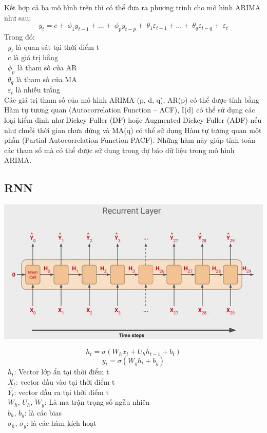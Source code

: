 Kết hợp cả ba mô hình trên thì có thể đưa ra phương trình cho mô hình ARIMA như sau:
\[y_{t} = c + \ \phi_{1}y_{t - 1} + \ldots + \ \phi_{p}y_{t - p} + \ \theta_{1}\varepsilon_{t - 1} + \ldots + \ \theta_{q}\varepsilon_{t - q} + \ \varepsilon_{t}\]
Trong đó:\\
    \indent\textbullet\ \(y_{t}\) là quan sát tại thời điểm t\\
    \indent\textbullet\ \(c\) là giá trị hằng\\
    \indent\textbullet\ \(\phi_{p}\) là tham số của AR\\
    \indent\textbullet\ \(\theta_{q}\) là tham số của MA\\
    \indent\textbullet\ \(\varepsilon_{t}\) là nhiễu trắng\\

Các giá trị tham số của mô hình ARIMA (p, d, q), AR(p) có thể được tính bằng Hàm tự tương quan (Autocorrelation Function – ACF), I(d) có thể sử dụng các loại kiểm định như Dickey Fuller (DF) hoặc Augmented Dickey Fuller (ADF) nếu như chuỗi thời gian chưa dừng và MA(q) có thể sử dụng Hàm tự tương quan một phần (Partial Autocorrelation Function PACF). Những hàm này giúp tính toán các tham số mà có thể được sử dụng trong dự báo dữ liệu trong mô hình ARIMA.

\subsection{RNN}
\begin{minipage}{0.45\textwidth}
\centering
\includegraphics[width=1\textwidth]{resources/chapter-4/rnn-1.png}
\end{minipage}
\[h_t = \sigma (W_{h}x_{t} + U_h h_{t-1} + b_t) \]
\[y_t = \sigma (W_{y} h_t + b_y)\]
    \indent\textbullet\ \(h_t\): Vector lớp ẩn tại thời điểm t\\
    \indent\textbullet\ \(X_t\): vector đầu vào tại thời điểm t\\
    \indent\textbullet\ \(\widehat{Y_t}\): vector đầu ra tại thời điểm t\\
    \indent\textbullet\ \(W_h\), \(U_h\), \(W_y\): Là ma trận trọng số ngẫu nhiên\\
    \indent\textbullet\ \(b_h\), \(b_y\): là các bias\\
    \indent\textbullet\ \(\sigma_h\), \(\sigma_y\): là các hàm kích hoạt\\

